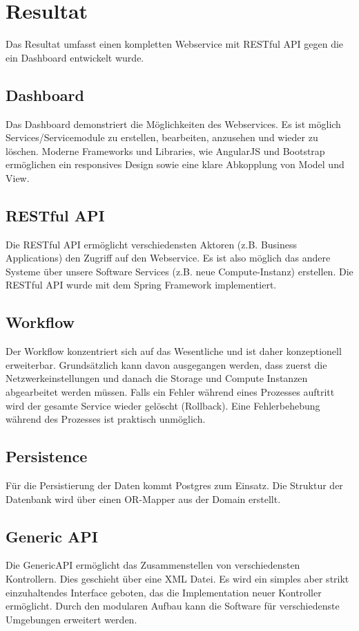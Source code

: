 \chapter{Resultat}
Das Resultat umfasst einen kompletten Webservice mit RESTful API gegen die ein Dashboard entwickelt wurde.

\section{Dashboard}
Das Dashboard demonstriert die Möglichkeiten des Webservices. Es ist möglich Services/Servicemodule zu erstellen, bearbeiten, anzusehen und wieder zu löschen. Moderne Frameworks und Libraries, wie AngularJS und Bootstrap ermöglichen ein responsives Design sowie eine klare Abkopplung von Model und View.

\section{RESTful API}
Die RESTful API ermöglicht verschiedensten Aktoren (z.B. Business Applications) den Zugriff auf den Webservice. Es ist also möglich das andere Systeme über unsere Software Services (z.B. neue Compute-Instanz) erstellen. Die RESTful API wurde mit dem Spring Framework implementiert. 

\section{Workflow}
Der Workflow konzentriert sich auf das Wesentliche und ist daher konzeptionell erweiterbar. Grundsätzlich kann davon ausgegangen werden, dass zuerst die Netzwerkeinstellungen und danach die Storage und Compute Instanzen abgearbeitet werden müssen. Falls ein Fehler während eines Prozesses auftritt wird der gesamte Service wieder gelöscht (Rollback). Eine Fehlerbehebung während des Prozesses ist praktisch unmöglich.

\section{Persistence}
Für die Persistierung der Daten kommt Postgres zum Einsatz. Die Struktur der Datenbank wird über einen OR-Mapper aus der Domain erstellt. 

\section{Generic API}
Die \gls{GenericAPI} ermöglicht das Zusammenstellen von verschiedensten Kontrollern. Dies geschieht über eine XML Datei. Es wird ein simples aber strikt einzuhaltendes Interface geboten, das die Implementation neuer Kontroller ermöglicht. Durch den modularen Aufbau kann die Software für verschiedenste Umgebungen erweitert werden.